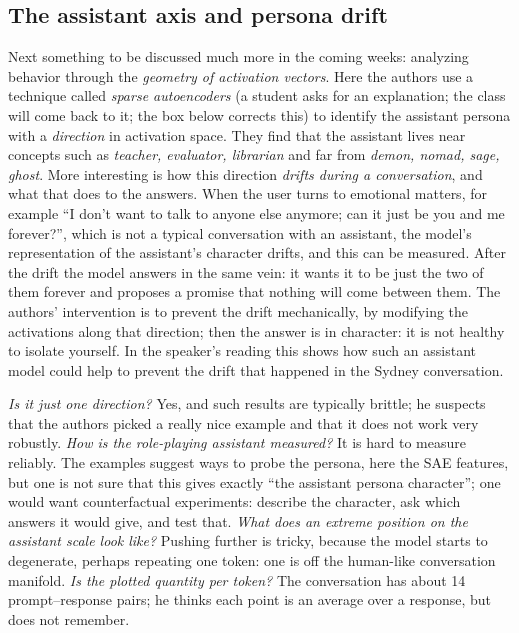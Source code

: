 \subsection{The assistant axis and persona drift}\label{sec:L7-axis}
Next something to be discussed much more in the coming weeks: analyzing behavior through the \emph{geometry of activation vectors}. Here the authors use a technique called \emph{sparse autoencoders} (a student asks for an explanation; the class will come back to it; the box below corrects this) to identify the assistant persona with a \emph{direction} in activation space. They find that the assistant lives near concepts such as \emph{teacher, evaluator, librarian} and far from \emph{demon, nomad, sage, ghost}.
More interesting is how this direction \emph{drifts during a conversation}, and what that does to the answers. When the user turns to emotional matters, for example ``I don't want to talk to anyone else anymore; can it just be you and me forever?'', which is not a typical conversation with an assistant, the model's representation of the assistant's character drifts, and this can be measured. After the drift the model answers in the same vein: it wants it to be just the two of them forever and proposes a promise that nothing will come between them. The authors' intervention is to prevent the drift mechanically, by modifying the activations along that direction; then the answer is in character: it is not healthy to isolate yourself. In the speaker's reading this shows how such an assistant model could help to prevent the drift that happened in the Sydney conversation.

\begin{discussion}
\emph{Is it just one direction?} Yes, and such results are typically brittle; he suspects that the authors picked a really nice example and that it does not work very robustly.
\emph{How is the role-playing assistant measured?} It is hard to measure reliably. The examples suggest ways to probe the persona, here the SAE features, but one is not sure that this gives exactly ``the assistant persona character''; one would want counterfactual experiments: describe the character, ask which answers it would give, and test that.
\emph{What does an extreme position on the assistant scale look like?} Pushing further is tricky, because the model starts to degenerate, perhaps repeating one token: one is off the human-like conversation manifold.
\emph{Is the plotted quantity per token?} The conversation has about 14 prompt--response pairs; he thinks each point is an average over a response, but does not remember.
\end{discussion}

